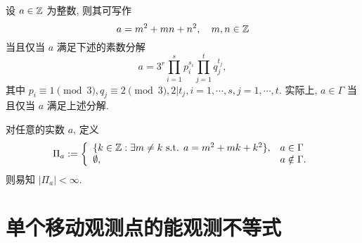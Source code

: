     \begin{corollary}\label{crc-3-2-2}
        设 $a\in \mathbb{Z}$ 为整数, 则其可写作
        \begin{equation*}
            a=m^2+mn+n^2,\quad m,n\in \mathbb{Z}
        \end{equation*}
    当且仅当 $a$ 满足下述的素数分解
    \begin{equation}\label{factorization}
        a=3^r \prod_{i=1}^s p_i^{s_i} \prod_{j=1}^t q_j^{t_j},
    \end{equation}
    其中 $p_i\equiv 1\pmod{3}, q_j\equiv 2\pmod{3}, 2|t_j,i=1,\cdots,s,j=1,\cdots,t$. 实际上, $a\in \Gamma$ 当且仅当 $a$ 满足上述分解.
    \end{corollary}
    
    \begin{proposition}
    对任意的实数 $a$, 定义
    \begin{equation*}
        \Pi_a:=\left\lbrace\begin{array}{ll}
           \lbrace k\in \mathbb{Z}:\exists m \neq k \text{ s.t. } a=m^2+mk+k^2\rbrace,  & a\in \Gamma  \\
            \emptyset, & a\notin \Gamma.
        \end{array}\right.
    \end{equation*}
    则易知 $|\Pi_a|<\infty$.
    \end{proposition}

\section{单个移动观测点的能观测不等式}

